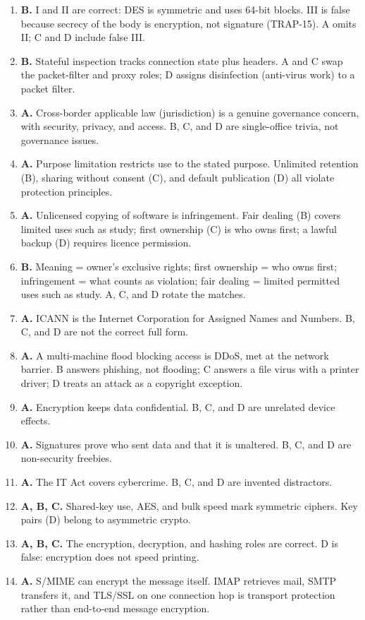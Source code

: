 \begin{enumerate}[label=\textbf{Q\arabic*.}, leftmargin=*]
\item \textbf{B.} I and II are correct: DES is symmetric and uses 64-bit
  blocks. III is false because secrecy of the body is encryption, not
  signature (TRAP-15). A omits II; C and D include false III.
\item \textbf{B.} Stateful inspection tracks connection state plus headers.
  A and C swap the packet-filter and proxy roles; D assigns disinfection
  (anti-virus work) to a packet filter.
\item \textbf{A.} Cross-border applicable law (jurisdiction) is a genuine
  governance concern, with security, privacy, and access. B, C, and D are
  single-office trivia, not governance issues.
\item \textbf{A.} Purpose limitation restricts use to the stated purpose.
  Unlimited retention (B), sharing without consent (C), and default
  publication (D) all violate protection principles.
\item \textbf{A.} Unlicensed copying of software is infringement. Fair dealing
  (B) covers limited uses such as study; first ownership (C) is who owns
  first; a lawful backup (D) requires licence permission.
\item \textbf{B.} Meaning = owner's exclusive rights; first ownership = who
  owns first; infringement = what counts as violation; fair dealing = limited
  permitted uses such as study. A, C, and D rotate the matches.
\item \textbf{A.} ICANN is the Internet Corporation for Assigned Names and
  Numbers. B, C, and D are not the correct full form.
\item \textbf{A.} A multi-machine flood blocking access is DDoS, met at the
  network barrier. B answers phishing, not flooding; C answers a file virus
  with a printer driver; D treats an attack as a copyright exception.

\item \textbf{A.} Encryption keeps data confidential. B, C, and D are unrelated device effects.
\item \textbf{A.} Signatures prove who sent data and that it is unaltered. B, C, and D are non-security freebies.
\item \textbf{A.} The IT Act covers cybercrime. B, C, and D are invented distractors.
\item \textbf{A, B, C.} Shared-key use, AES, and bulk speed mark symmetric ciphers. Key pairs (D) belong to asymmetric crypto.
\item \textbf{A, B, C.} The encryption, decryption, and hashing roles are correct. D is false: encryption does not speed printing.
\item \textbf{A.} S/MIME can encrypt the message itself. IMAP retrieves mail, SMTP transfers it, and TLS/SSL on one connection hop is transport protection rather than end-to-end message encryption.


\end{enumerate}
